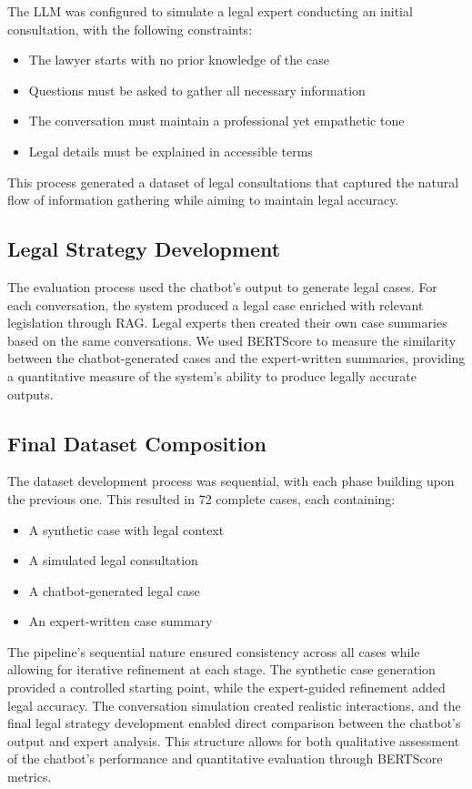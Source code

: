 The LLM was configured to simulate a legal expert conducting an initial consultation, with the following constraints:
\begin{itemize}
    \item The lawyer starts with no prior knowledge of the case
    \item Questions must be asked to gather all necessary information
    \item The conversation must maintain a professional yet empathetic tone
    \item Legal details must be explained in accessible terms
\end{itemize}

This process generated a dataset of legal consultations that captured the natural flow of information gathering while aiming to maintain legal accuracy.

\subsection{Legal Strategy Development}
The evaluation process used the chatbot's output to generate legal cases. For each conversation, the system produced a legal case 
enriched with relevant legislation through RAG. Legal experts then created their own case summaries based on the same conversations. 
We used BERTScore to measure the similarity between the chatbot-generated cases and the expert-written summaries, 
providing a quantitative measure of the system's ability to produce legally accurate outputs.

\subsection{Final Dataset Composition}
The dataset development process was sequential, with each phase building upon the previous one. This resulted in 72 complete cases, each containing:
\begin{itemize}
    \item A synthetic case with legal context
    \item A simulated legal consultation
    \item A chatbot-generated legal case
    \item An expert-written case summary
\end{itemize}

The pipeline's sequential nature ensured consistency across all cases while allowing for iterative refinement at each stage. 
The synthetic case generation provided a controlled starting point, while the expert-guided refinement added legal accuracy. 
The conversation simulation created realistic interactions, and the final legal strategy development enabled direct comparison 
between the chatbot's output and expert analysis. This structure allows for both qualitative assessment of the chatbot's performance 
and quantitative evaluation through BERTScore metrics.


